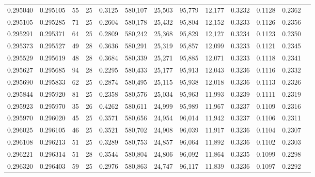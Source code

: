 \begin{tabular}{rrrrrrrrrrrrr}
0.295040 & 0.295105 &  55 &  25 &                                     0.3125 & 580,107 &  25,503 &  95,779 &  12,177 & 0.3232 & 0.1128 & 0.2362 \\
0.295105 & 0.295285 &  71 &  25 &                                     0.2604 & 580,178 &  25,432 &  95,804 &  12,152 & 0.3233 & 0.1126 & 0.2356 \\
0.295291 & 0.295371 &  64 &  25 &                                     0.2809 & 580,242 &  25,368 &  95,829 &  12,127 & 0.3234 & 0.1123 & 0.2350 \\
0.295373 & 0.295527 &  49 &  28 &                                     0.3636 & 580,291 &  25,319 &  95,857 &  12,099 & 0.3233 & 0.1121 & 0.2345 \\
0.295529 & 0.295619 &  48 &  28 &                                     0.3684 & 580,339 &  25,271 &  95,885 &  12,071 & 0.3233 & 0.1118 & 0.2341 \\
0.295627 & 0.295685 &  94 &  28 &                                     0.2295 & 580,433 &  25,177 &  95,913 &  12,043 & 0.3236 & 0.1116 & 0.2332 \\
0.295690 & 0.295833 &  62 &  25 &                                     0.2874 & 580,495 &  25,115 &  95,938 &  12,018 & 0.3236 & 0.1113 & 0.2326 \\
0.295844 & 0.295920 &  81 &  25 &                                     0.2358 & 580,576 &  25,034 &  95,963 &  11,993 & 0.3239 & 0.1111 & 0.2319 \\
0.295923 & 0.295970 &  35 &  26 &                                     0.4262 & 580,611 &  24,999 &  95,989 &  11,967 & 0.3237 & 0.1109 & 0.2316 \\
0.295970 & 0.296020 &  45 &  25 &                                     0.3571 & 580,656 &  24,954 &  96,014 &  11,942 & 0.3237 & 0.1106 & 0.2311 \\
0.296025 & 0.296105 &  46 &  25 &                                     0.3521 & 580,702 &  24,908 &  96,039 &  11,917 & 0.3236 & 0.1104 & 0.2307 \\
0.296108 & 0.296213 &  51 &  25 &                                     0.3289 & 580,753 &  24,857 &  96,064 &  11,892 & 0.3236 & 0.1102 & 0.2303 \\
0.296221 & 0.296314 &  51 &  28 &                                     0.3544 & 580,804 &  24,806 &  96,092 &  11,864 & 0.3235 & 0.1099 & 0.2298 \\
0.296320 & 0.296403 &  59 &  25 &                                     0.2976 & 580,863 &  24,747 &  96,117 &  11,839 & 0.3236 & 0.1097 & 0.2292 \\

\end{tabular}
